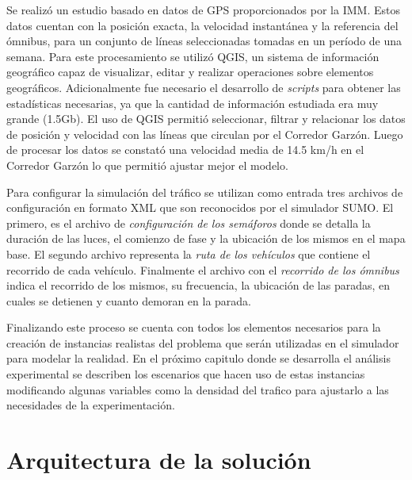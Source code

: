 Se realizó un estudio basado en datos de GPS proporcionados por la IMM. Estos datos cuentan con la posición exacta, la velocidad instantánea y la referencia del ómnibus, para un conjunto de líneas seleccionadas tomadas en un período de una semana. 
Para este procesamiento se utilizó QGIS, un sistema de información geográfico capaz de visualizar, editar y realizar operaciones sobre elementos geográficos. Adicionalmente fue necesario el desarrollo de \emph{scripts} para obtener las estadísticas necesarias, ya que la cantidad de información estudiada era muy grande (1.5Gb). El uso de QGIS permitió seleccionar, filtrar y relacionar los datos de posición y velocidad con las líneas que circulan por el Corredor Garzón. Luego de procesar los datos se constató una velocidad media de 14.5 km/h en el Corredor Garzón lo que permitió ajustar mejor el modelo. 

Para configurar la simulación del tráfico se utilizan como entrada tres archivos de configuración en formato XML que son reconocidos por el simulador SUMO. El primero, es el archivo de \emph{configuración de los semáforos} donde se detalla la duración de las luces, el comienzo de fase y la ubicación de los mismos en el mapa base. El segundo archivo representa la \emph{ruta de los vehículos} que contiene el recorrido de cada vehículo. Finalmente el archivo con el \emph{recorrido de los ómnibus} indica el recorrido de los mismos, su frecuencia, la ubicación de las paradas, en cuales se detienen y cuanto demoran en la parada.

Finalizando este proceso se cuenta con todos los elementos necesarios para la creación de instancias realistas del problema que serán utilizadas en el simulador para modelar la realidad. En el próximo capitulo donde se desarrolla el análisis experimental se describen los escenarios que hacen uso de estas instancias modificando algunas variables como la densidad del trafico para ajustarlo a las necesidades de la experimentación.


\section{Arquitectura de la solución}

